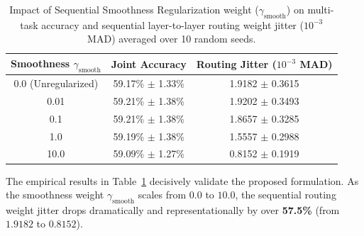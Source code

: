 \begin{table}[h]
\caption{Impact of Sequential Smoothness Regularization weight ($\gamma_{\text{smooth}}$) on multi-task accuracy and sequential layer-to-layer routing weight jitter ($10^{-3}$ MAD) averaged over 10 random seeds.}
\label{tab:smoothness_sweep}
\vskip 0.15in
\begin{center}
\begin{small}
\begin{sc}
\setlength{\tabcolsep}{5pt}
\begin{tabular}{ccc}
\toprule
Smoothness $\gamma_{\text{smooth}}$ & Joint Accuracy & Routing Jitter ($10^{-3}$ MAD) \\
\midrule
0.0 (Unregularized) & 59.17\% $\pm$ 1.33\% & 1.9182 $\pm$ 0.3615 \\
0.01                & 59.21\% $\pm$ 1.38\% & 1.9202 $\pm$ 0.3493 \\
0.1                 & 59.21\% $\pm$ 1.38\% & 1.8657 $\pm$ 0.3285 \\
1.0                 & 59.19\% $\pm$ 1.38\% & 1.5557 $\pm$ 0.2988 \\
10.0                & 59.09\% $\pm$ 1.27\% & 0.8152 $\pm$ 0.1919 \\
\bottomrule
\end{tabular}
\end{sc}
\end{small}
\end{center}
\vskip -0.1in
\end{table}

The empirical results in Table~\ref{tab:smoothness_sweep} decisively validate the proposed formulation. As the smoothness weight $\gamma_{\text{smooth}}$ scales from $0.0$ to $10.0$, the sequential routing weight jitter drops dramatically and representationally by over \textbf{57.5\%} (from $1.9182$ to $0.8152$). 

